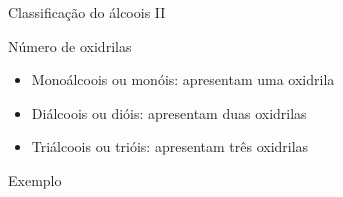 \documentclass[presentation,professionalfonts,aspectratio=169]{beamer}
\newcommand{\af}{\hspace{2cm}}
\begin{document}
\begin{frame}[label={sec:org27d8014}]{Classificação do álcoois II}
\begin{myrule}{Número de oxidrilas}

\begin{itemize}
\item Monoálcoois ou monóis: apresentam uma oxidrila
\item Diálcoois ou dióis: apresentam duas oxidrilas
\item Triálcoois ou trióis: apresentam três oxidrilas
\end{itemize}

\end{myrule}

\begin{myex}{Exemplo}
 \af
{} \af
{}
\end{myex}
\end{frame}
\end{document}
